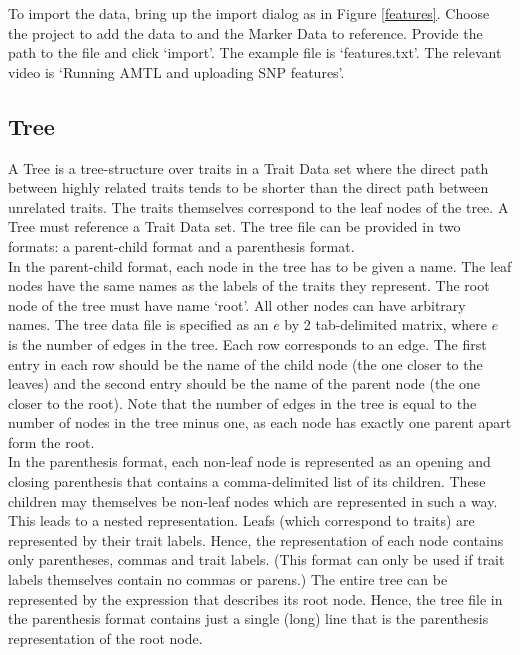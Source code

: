 \documentclass{article}
\begin{document}
To import the data, bring up the import dialog as in Figure \ref{features}. Choose the project to add the data to and the Marker Data to reference. Provide the path to the file and click `import'. The example file is `features.txt'. The relevant video is `Running AMTL and uploading SNP features'.

\subsection{Tree}

A Tree is a tree-structure over traits in a Trait Data set where the direct path between highly related traits tends to be shorter than the direct path between unrelated traits. The traits themselves correspond to the leaf nodes of the tree. A Tree must reference a Trait Data set. The tree file can be provided in two formats: a parent-child format and a parenthesis format. \\

In the parent-child format, each node in the tree has to be given a name. The leaf nodes have the same names as the labels of the traits they represent. The root node of the tree must have name `root'. All other nodes can have arbitrary names. The tree data file is specified as an $e$ by 2 tab-delimited matrix, where $e$ is the number of edges in the tree. Each row corresponds to an edge. The first entry in each row should be the name of the child node (the one closer to the leaves) and the second entry should be the name of the parent node (the one closer to the root). Note that the number of edges in the tree is equal to the number of nodes in the tree minus one, as each node has exactly one parent apart form the root.\\

In the parenthesis format, each non-leaf node is represented as an opening and closing parenthesis that contains a comma-delimited list of its children. These children may themselves be non-leaf nodes which are represented in such a way. This leads to a nested representation. Leafs (which correspond to traits) are represented by their trait labels. Hence, the representation of each node contains only parentheses, commas and trait labels. (This format can only be used if trait labels themselves contain no commas or parens.) The entire tree can be represented by the expression that describes its root node. Hence, the tree file in the parenthesis format contains just a single (long) line that is the parenthesis representation of the root node.\\
\end{document}
